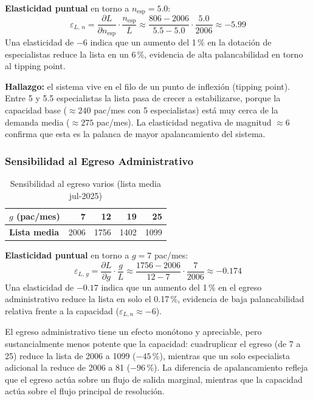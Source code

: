 \documentclass[12pt,a4paper]{article}
\begin{document}
\textbf{Elasticidad puntual} en torno a $n_{\text{esp}}=5.0$:
\[
  \varepsilon_{L,\,n} = \frac{\partial L}{\partial n_{\text{esp}}} \cdot \frac{n_{\text{esp}}}{L}
  \approx \frac{806 - 2006}{5.5 - 5.0} \cdot \frac{5.0}{2006} \approx -5.99
\]
Una elasticidad de $-6$ indica que un aumento del 1\,\% en la dotación de especialistas reduce la lista en un 6\,\%, evidencia de alta palancabilidad en torno al tipping point.

\textbf{Hallazgo:} el sistema vive en el filo de un punto de inflexión (tipping point). Entre 5 y 5.5 especialistas la lista pasa de crecer a estabilizarse, porque la capacidad base ($\approx 240$ pac/mes con 5 especialistas) está muy cerca de la demanda media ($\approx 275$ pac/mes). La elasticidad negativa de magnitud $\approx 6$ confirma que esta es la palanca de mayor apalancamiento del sistema.

\subsubsection*{Sensibilidad al Egreso Administrativo}

\begin{table}[H]
  \centering
  \caption{Sensibilidad al egreso varios (lista media jul-2025)}
  \label{tab:sens_egr}
  \begin{tabular}{@{}lrrrr@{}}
    \toprule
    \rowcolor{azulDS!15}
    \textbf{$g$ (pac/mes)} & 7    & 12   & 19   & 25   \\
    \midrule
    \textbf{Lista media}   & 2006 & 1756 & 1402 & 1099 \\
    \bottomrule
  \end{tabular}
\end{table}

\textbf{Elasticidad puntual} en torno a $g=7$ pac/mes:
\[
  \varepsilon_{L,\,g} = \frac{\partial L}{\partial g} \cdot \frac{g}{L}
  \approx \frac{1756 - 2006}{12 - 7} \cdot \frac{7}{2006} \approx -0.174
\]
Una elasticidad de $-0.17$ indica que un aumento del 1\,\% en el egreso administrativo reduce la lista en solo el 0.17\,\%, evidencia de baja palancabilidad relativa frente a la capacidad ($\varepsilon_{L,n} \approx -6$).

El egreso administrativo tiene un efecto monótono y apreciable, pero sustancialmente menos potente que la capacidad: cuadruplicar el egreso (de 7 a 25) reduce la lista de 2006 a 1099 ($-45$\,\%), mientras que un solo especialista adicional la reduce de 2006 a 81 ($-96$\,\%). La diferencia de apalancamiento refleja que el egreso actúa sobre un flujo de salida marginal, mientras que la capacidad actúa sobre el flujo principal de resolución.
\end{document}

